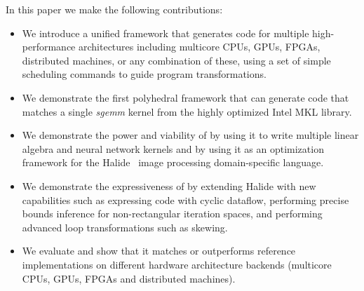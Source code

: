 In this paper we make the following contributions:

\begin{itemize}
  \item We introduce a unified framework that generates code for multiple high-performance architectures including multicore CPUs, GPUs, FPGAs, distributed machines, or any combination of these, using a set of simple scheduling commands to guide program transformations.


  \item We demonstrate the first polyhedral framework that can generate code that matches a single \emph{sgemm} kernel from the highly optimized Intel MKL library.

  \item We demonstrate the power and viability of \framework{} by using it to write multiple linear algebra and neural network kernels and by using it as an optimization framework for the Halide~\cite{halide_12,DBLP:conf/pldi/Ragan-KelleyBAPDA13} image processing domain-specific language.

  \item We demonstrate the expressiveness of \framework{} by extending Halide with new capabilities such as expressing code with cyclic dataflow, performing precise bounds inference for non-rectangular iteration spaces, and performing advanced loop transformations such as skewing.

  \item We evaluate \framework{} and show that it matches or outperforms reference implementations on different hardware architecture backends (multicore CPUs, GPUs, FPGAs and distributed machines).
\end{itemize}